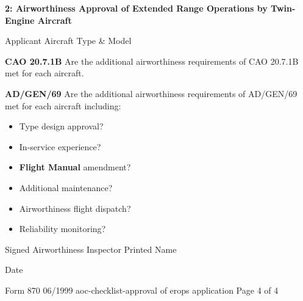 \documentclass[11pt]{article}
\newcommand{\sectiontitle}[1]{{\large\textbf{#1}}\vspace{0.5em}}
\newcommand{\footer}{
    \vfill
    {\footnotesize Form 870 06/1999 \hfill aoc-checklist-approval of erops application \hfill Page 4 of 4}
}
\begin{document}
\pagestyle{empty}

\sectiontitle{2: Airworthiness Approval of Extended Range Operations by Twin-Engine Aircraft}

Applicant \underline{\hspace{5cm}} Aircraft Type \& Model \underline{\hspace{5cm}}

\vspace{1em}

\textbf{CAO 20.7.1B} Are the additional airworthiness requirements of CAO 20.7.1B met for each aircraft.  

\vspace{1em}

\textbf{AD/GEN/69} Are the additional airworthiness requirements of AD/GEN/69 met for each aircraft including:

\begin{itemize}
    \item Type design approval? \underline{\hspace{3cm}}  
    \item In-service experience? \underline{\hspace{3cm}}  
    \item \textbf{Flight Manual} amendment? \underline{\hspace{3cm}}  
    \item Additional maintenance? \underline{\hspace{3cm}}  
    \item Airworthiness flight dispatch? \underline{\hspace{3cm}}  
    \item Reliability monitoring? \underline{\hspace{3cm}}  
\end{itemize}

\vspace{1em}

Signed \underline{\hspace{5cm}} Airworthiness Inspector \hspace{2em} Printed Name \underline{\hspace{5cm}}

\vspace{1em}

Date \underline{\hspace{5cm}}

\footer
\end{document}
